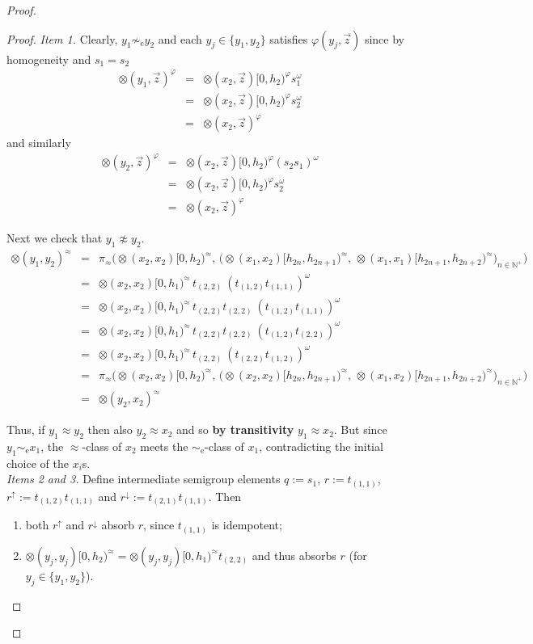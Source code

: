 \documentclass{stacs_proc}
\newcommand{\Nat}{\mathbb{N}}
\newcommand{\eqe}{\sim_{\textrm{e}}}
\begin{document}
\begin{proof}
\begin{proof}
\noindent
{\em Item 1.} Clearly, $y_1 \not\eqe y_2$ and
each $y_j \in \{y_1,y_2\}$ satisfies $\varphi(y_j,\vec{z})$ since by homogeneity 
and $s_1 = s_2$
\begin{eqnarray*}
\otimes(y_1,\vec{z})^\varphi 	& = &	\otimes(x_2,\vec{z})[0,h_2)^\varphi s_1^\omega \\
				& = &	\otimes(x_2,\vec{z})[0,h_2)^\varphi s_2^\omega \\
				& = &	\otimes(x_2,\vec{z})^\varphi
\end{eqnarray*}
and similarly
\begin{eqnarray*}
\otimes(y_2,\vec{z})^\varphi 	& = &	\otimes(x_2,\vec{z})[0,h_2)^\varphi (s_2 s_1)^\omega \\
				& = &	\otimes(x_2,\vec{z})[0,h_2)^\varphi s_2^\omega \\
				& = &	\otimes(x_2,\vec{z})^\varphi
\end{eqnarray*}

Next we check that $y_1 \not \approx y_2$. 
\begin{eqnarray*}
\otimes(y_1,y_2)^\approx	
& = & 	\pi_\approx \big( 
		\otimes(x_2,x_2)[0,h_2)^\approx,\, 
		\big( \otimes(x_1,x_2)[h_{2n},h_{2n+1})^\approx,\, 
		 \otimes(x_1,x_1)[h_{2n+1},h_{2n+2})^\approx
		\big)_{n  \in \Nat^+}
		\big)\\
& = & 	\otimes(x_2,x_2)[0,h_1)^\approx \, t_{(2,2)} \ 
		(t_{(1,2)}t_{(1,1)})^{\omega}\\
& = & 	\otimes(x_2,x_2)[0,h_1)^\approx \,  
		t_{(2,2)}t_{(2,2)} \  
		(t_{(1,2)}t_{(1,1)})^{\omega}\\
& = & 	\otimes(x_2,x_2)[0,h_1)^\approx \,  
		t_{(2,2)}t_{(2,2)} \  
		(t_{(1,2)}t_{(2,2)})^{\omega}\\
& = & 	\otimes(x_2,x_2)[0,h_1)^\approx \,  
		t_{(2,2)} \  
		(t_{(2,2)} t_{(1,2)})^{\omega}\\
& = & 	\pi_\approx \big( 
		\otimes(x_2,x_2)[0,h_2)^\approx,\, 
		\big(\otimes(x_2,x_2)[h_{2n},h_{2n+1})^\approx,\, 
		 \otimes(x_1,x_2)[h_{2n+1},h_{2n+2})^\approx
		\big)_{n  \in \Nat^+}
		\big)\\
& = & 	\otimes(y_2,x_2)^\approx	
\end{eqnarray*}

Thus, if $y_1 \approx y_2$ then also $y_2 \approx x_2$ and so {\bf by transitivity}
$y_1 \approx x_2$. But since $y_1 \eqe x_1$, the $\approx$-class of $x_2$
meets the $\eqe$-class of $x_1$, contradicting the initial choice of the $x_i$s. \\

\noindent
{\em Items 2 and 3.} 
Define intermediate semigroup elements $q:= s_1$, $r := t_{(1,1)}$, $r^\uparrow
:= t_{(1,2)} t_{(1,1)}$ and $r^\downarrow := t_{(2,1)} t_{(1,1)}$.  
Then
\begin{enumerate}
\item both $r^\uparrow$ and $r^\downarrow$ absorb $r$, since $t_{(1,1)}$ is idempotent;
\item $\otimes(y_j,y_j)[0,h_2)^\approx = \otimes(y_j,y_j)[0,h_1)^\approx t_{(2,2)}$ 
      and thus absorbs $r$ (for $y_j \in \{y_1,y_2\}$). 
\end{enumerate}


\end{proof}
\end{proof}
\end{document}
